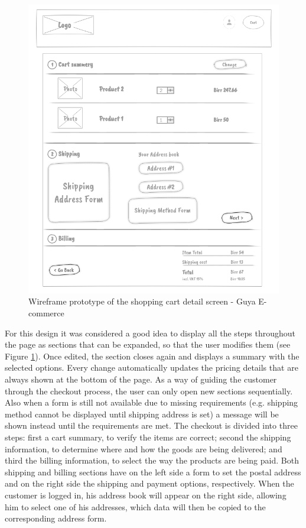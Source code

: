 \begin{figure}[!h]
\center
\includegraphics[keepaspectratio, width=15cm]{wireframes/checkoutpage.png}
\caption{Wireframe prototype of the shopping cart detail screen - Guya E-commerce}
\label{checkout-page}
\end{figure}
\clearpage

For this design it was considered a good idea to display all the steps throughout the page as sections that can be expanded, so that the user modifies them (see Figure \ref{checkout-page}). Once edited, the section closes again and displays a summary with the selected options. Every change automatically updates the pricing details that are always shown at the bottom of the page. As a way of guiding the customer through the checkout process, the user can only open new sections sequentially. Also when a form is still not available due to missing requirements (e.g. shipping method cannot be displayed until shipping address is set) a message will be shown instead until the requirements are met.
The checkout is divided into three steps: first a cart summary, to verify the items are correct; second the shipping information, to determine where and how the goods are being delivered; and third the billing information, to select the way the products are being paid. Both shipping and billing sections have on the left side a form to set the postal address and on the right side the shipping and payment options, respectively. When the customer is logged in, his address book will appear on the right side, allowing him to select one of his addresses, which data will then be copied to the corresponding address form.



